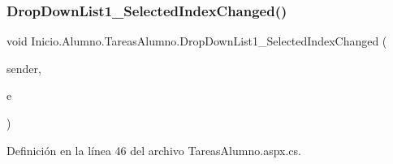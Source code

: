 \subsubsection{\texorpdfstring{DropDownList1\_SelectedIndexChanged()}{DropDownList1\_SelectedIndexChanged()}}
{\footnotesize\ttfamily void Inicio.\+Alumno.\+Tareas\+Alumno.\+Drop\+Down\+List1\+\_\+\+Selected\+Index\+Changed (\begin{DoxyParamCaption}\item[{object}]{sender,  }\item[{Event\+Args}]{e }\end{DoxyParamCaption})\hspace{0.3cm}{\ttfamily [protected]}}



Definición en la línea 46 del archivo Tareas\+Alumno.\+aspx.\+cs.


